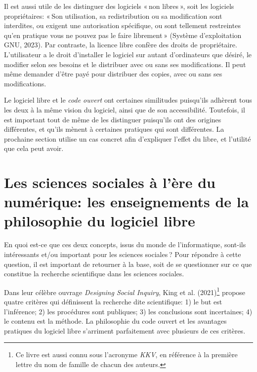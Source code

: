 \documentclass[
  letterpaper,
  DIV=11,
  numbers=noendperiod]{scrreprt}
\begin{document}
Il est aussi utile de les distinguer des logiciels « non libres », soit
les logiciels propriétaires: « Son utilisation, sa redistribution ou sa
modification sont interdites, ou exigent une autorisation spécifique, ou
sont tellement restreintes qu'en pratique vous ne pouvez pas le faire
librement » (Système d'exploitation GNU, 2023). Par contraste, la
licence libre confère des droits de propriétaire. L'utilisateur a le
droit d'installer le logiciel sur autant d'ordinateurs que désiré, le
modifier selon ses besoins et le distribuer avec ou sans ses
modifications. Il peut même demander d'être payé pour distribuer des
copies, avec ou sans ses modifications.

Le logiciel libre et le \emph{code ouvert} ont certaines similitudes
puisqu'ils adhèrent tous les deux à la même vision du logiciel, ainsi
que de son accessibilité. Toutefois, il est important tout de même de
les distinguer puisqu'ils ont des origines différentes, et qu'ils mènent
à certaines pratiques qui sont différentes. La prochaine section utilise
un cas concret afin d'expliquer l'effet du libre, et l'utilité que cela
peut avoir.

\hypertarget{les-sciences-sociales-uxe0-luxe8re-du-numuxe9rique-les-enseignements-de-la-philosophie-du-logiciel-libre}{%
\section{Les sciences sociales à l'ère du numérique: les enseignements
de la philosophie du logiciel
libre}\label{les-sciences-sociales-uxe0-luxe8re-du-numuxe9rique-les-enseignements-de-la-philosophie-du-logiciel-libre}}

En quoi est-ce que ces deux concepts, issus du monde de l'informatique,
sont-ils intéressants et/ou important pour les sciences sociales ? Pour
répondre à cette question, il est important de retourner à la base, soit
de se questionner sur ce que constitue la recherche scientifique dans
les sciences sociales.

Dans leur célèbre ouvrage \emph{Designing Social Inquiry}, King et al.
(2021)\footnote{Ce livre est aussi connu sous l'acronyme \emph{KKV}, en
  référence à la première lettre du nom de famille de chacun des
  auteurs.} propose quatre critères qui définissent la recherche dite
scientifique: 1) le but est l'inférence; 2) les procédures sont
publiques; 3) les conclusions sont incertaines; 4) le contenu est la
méthode. La philosophie du code ouvert et les avantages pratiques du
logiciel libre s'arriment parfaitement avec plusieurs de ces critères.
\end{document}
